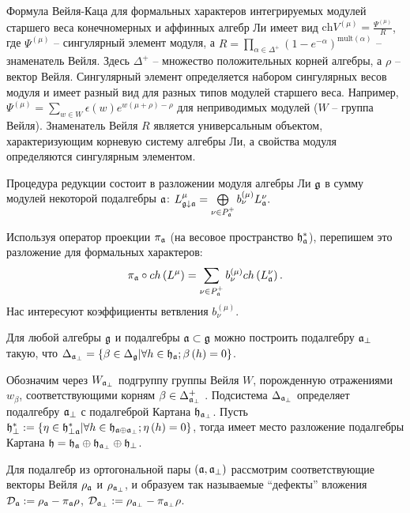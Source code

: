 \documentclass[14pt,autoref,href,facsimile
]{disser}
\begin{document}
Формула Вейля-Каца для формальных характеров интегрируемых модулей старшего веса конечномерных и аффинных алгебр Ли имеет вид $\mathrm{ch} V^{(\mu)} = \frac{\Psi^{(\mu)}}{R}$,
где $\Psi^{(\mu)}$ -- сингулярный элемент модуля, а $R=\prod_{\alpha\in \Delta^+}(1-e^{-\alpha})^{\mathrm{mult}(\alpha)}$ -- знаменатель Вейля. Здесь $\Delta^+$ -- множество положительных корней алгебры, а $\rho$ -- вектор Вейля. Сингулярный элемент определяется набором сингулярных весов модуля и имеет разный вид для разных типов модулей старшего веса. Например, $\Psi^{(\mu)}=\sum_{w\in W} \epsilon(w) e^{w(\mu+\rho)-\rho}$ для неприводимых модулей ($W$ -- группа Вейля). Знаменатель  Вейля $R$ является универсальным объектом, характеризующим корневую систему алгебры Ли, а свойства модуля определяются сингулярным элементом.

Процедура редукции состоит в разложении модуля алгебры Ли $\mathfrak{g}$ в сумму модулей некоторой подалгебры $\mathfrak{a}$:
$ L_{\mathfrak{g}\downarrow \mathfrak{a}}^{\mu }=\bigoplus
\limits_{\nu \in P_{\mathfrak{a}}^{+}}b_{\nu }^{\left( \mu \right) }L_{\mathfrak{a}}^{\nu }.$

Используя оператор проекции  $\pi_{\mathfrak{a}}$ (на весовое пространство $\mathfrak{h}_{\mathfrak{a}}^*$), перепишем это разложение для формальных характеров: 
\begin{equation}
\label{branching1}
 \pi _{\mathfrak{a}}\circ ch\left( L^{\mu }\right)
 =\sum_{\nu \in P_{\mathfrak{a}}^{+}}b_{\nu }^{(\mu)}ch\left( L_{\mathfrak{a}}^{\nu }\right) .
\end{equation}
Нас интересуют коэффициенты ветвления $b^{(\mu)}_{\nu}$.

Для любой алгебры $\mathfrak{g}$ и подалгебры $\mathfrak{a}\subset \mathfrak{g}$ можно построить  подалгебру $\mathfrak{a}_{\perp}$ такую, что $\Delta _{\mathfrak{a}_{\perp }} =\left\{ \beta \in \Delta _{\mathfrak{g}}| \forall h \in \mathfrak{h}_{\mathfrak{a}};  \beta\left(h \right)=0  \right\}$.

Обозначим через $W_{\mathfrak{a}_{\perp}}$ подгруппу группы Вейля $W$, порожденную отражениями $w _{\beta }$, соответствующими корням $\beta \in \Delta _{\mathfrak{a}_{\perp}}^{+}$ . Подсистема  $\Delta _{\mathfrak{a}_{\perp }}$ определяет подалгебру $\mathfrak{a}_{\perp }$ с подалгеброй Картана $\mathfrak{h}_{\mathfrak{a}_{\perp}}$.  Пусть
$\mathfrak{h}_{\perp }^{\ast }:=\left\{ \eta \in \mathfrak{h}_{\perp \mathfrak{a}}^{\ast
}|\forall h \in \mathfrak{h}_{\mathfrak{a}\oplus \mathfrak{a}_{\perp}}; \eta \left( h \right)=0 \right\}$, тогда имеет место разложение подалгебры Картана $\mathfrak{h}=\frak{\mathfrak{h}_{\mathfrak{a}}}\oplus \mathfrak{h}_{\mathfrak{a}_{\perp}}\oplus\mathfrak{h}_{\perp }$.

Для подалгебр из ортогональной пары  $\left( \mathfrak{a},\mathfrak{a}_{\perp}\right) $ рассмотрим соответствующие векторы Вейля $\rho _{\mathfrak{a}}$ и $\rho _{\mathfrak{a}_{\perp }}$, и образуем так называемые  ``дефекты'' вложения $\mathcal{D}_{\mathfrak{a}}:=\rho _{\mathfrak{a}}-\pi _{\mathfrak{a}}\rho$, $\mathcal{D}_{\mathfrak{a}_{\perp }}:=\rho _{\mathfrak{a}_{\perp }}-\pi_{\mathfrak{a}_{\perp}}\rho$.
\end{document}
